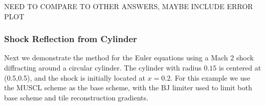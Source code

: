 \begin{table}
\centering
{}
\quad
\vspace*{.2in}


\caption{Errors for the nonlinear convergence study.}
\end{table}

NEED TO COMPARE TO OTHER ANSWERS, MAYBE INCLUDE  ERROR PLOT

\subsubsection{Shock Reflection from  Cylinder}
Next we demonstrate the method for the Euler equations using a Mach 2
shock diffracting around a circular cylinder. The cylinder with radius $0.15$ is centered at
(0.5,0.5), and the shock is initially located at $x = 0.2$.
For this example we use the MUSCL scheme as the base scheme, with the BJ limiter used to limit
both base scheme and tile reconstruction gradients. 

